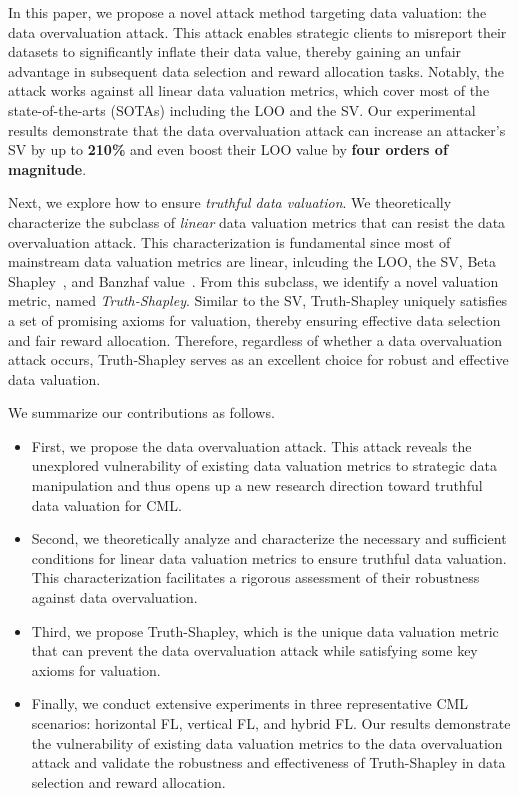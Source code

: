 In this paper, we propose a novel attack method targeting data valuation: the data overvaluation attack. 
This attack enables strategic clients to misreport their datasets to significantly inflate their data value, thereby gaining an unfair advantage in subsequent data selection and reward allocation tasks. 
Notably, the attack works against all linear data valuation metrics, which cover most of the state-of-the-arts (SOTAs) including the LOO and the SV. 
Our experimental results demonstrate that the data overvaluation attack can increase an attacker’s SV by up to \textbf{210\%} and even boost their LOO value by \textbf{four orders of magnitude}.

Next, we explore how to ensure \textit{truthful data valuation}.
We theoretically characterize the subclass of \textit{linear} data valuation metrics that can resist the data overvaluation attack. 
This characterization is fundamental since most of mainstream data valuation metrics are linear, inlcuding the LOO, the SV, Beta Shapley~\citep{kwon2022beta}, and Banzhaf value~\cite{wang2023data}.
From this subclass, we identify a novel valuation metric, named \textit{Truth-Shapley}. 
Similar to the SV, Truth-Shapley uniquely satisfies a set of promising axioms for valuation, thereby ensuring effective data selection and fair reward allocation. 
Therefore, regardless of whether a data overvaluation attack occurs, Truth-Shapley serves as an excellent choice for robust and effective data valuation.

We summarize our contributions as follows.
\begin{itemize}[leftmargin=*]
    \item First, we propose the data overvaluation attack.
    This attack reveals the unexplored vulnerability of existing data valuation metrics to strategic data manipulation and thus opens up a new research direction toward truthful data valuation for CML.
    \item Second, we theoretically analyze and characterize the necessary and sufficient conditions for linear data valuation metrics to ensure truthful data valuation. This characterization facilitates a rigorous assessment of their robustness against data overvaluation.
    \item Third, we propose Truth-Shapley, which is the unique data valuation metric that can prevent the data overvaluation attack while satisfying some key axioms for valuation.
    \item Finally, we conduct extensive experiments in three representative CML scenarios: horizontal FL, vertical FL, and hybrid FL. 
    Our results demonstrate the vulnerability of existing data valuation metrics to the data overvaluation attack and validate the robustness and effectiveness of Truth-Shapley in data selection and reward allocation.
\end{itemize}